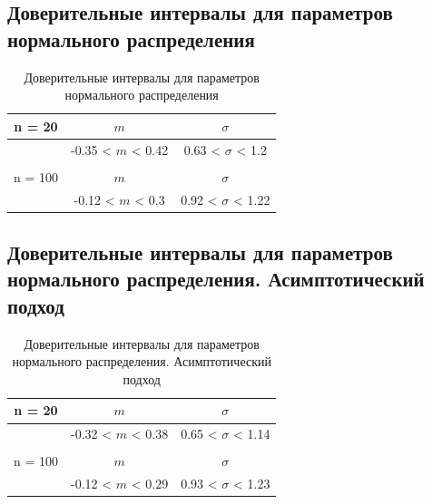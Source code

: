 \documentclass[../body.tex]{subfiles}
\begin{document}
		\subsection{Доверительные интервалы для параметров нормального распределения}
		\begin{table}[H]
			\centering
			\begin{tabular}{| c | c | c |}
				\hline
				n = 20   &  $m$  & $\sigma$\\ \hline
				&  -0.35 < $m$ < 0.42 & 0.63 < $\sigma$ < 1.2 \\ \hline
				&   &   \\ \hline
				n = 100   &  $m$  & $\sigma$\\ \hline
				& -0.12 < $m$ < 0.3 & 0.92 < $\sigma$ < 1.22 \\
				\hline
			\end{tabular}
			\caption{Доверительные интервалы для параметров нормального распределения}
			\label{tab:interv_simple}
		\end{table}
		
		\subsection{Доверительные интервалы для параметров нормального распределения. Асимптотический подход}
		\begin{table}[H]
			\centering
			\begin{tabular}{| c | c | c |}
				\hline
				n = 20   &  $m$  & $\sigma$\\ \hline
				& -0.32 < $m$ < 0.38 & 0.65 < $\sigma$ < 1.14 \\ \hline
				&   &   \\ \hline
				n = 100   &  $m$  & $\sigma$\\ \hline
				& -0.12 < $m$ < 0.29 & 0.93 < $\sigma$ < 1.23 \\
				\hline
			\end{tabular}
			\caption{Доверительные интервалы для параметров нормального распределения. Асимптотический подход}
			\label{tab:interv_asimpt}
		\end{table}
		
	
	
\end{document}
